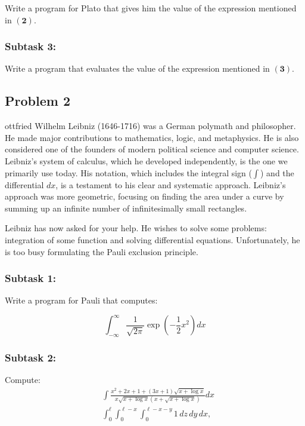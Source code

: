 \documentclass[12pt]{article}
\begin{document}
    Write a program for Plato that gives him the value of the expression mentioned in $\mathbf{(2)}$.
    
    \subsubsection*{\textbf{Subtask 3:}} 
    
    Write a program that evaluates the value of the expression mentioned in $\mathbf{(3)}$.

\newpage
\subsection{Problem 2}
ottfried Wilhelm Leibniz (1646-1716) was a German polymath and philosopher. He made major contributions to mathematics, logic, and metaphysics. He is also considered one of the founders of modern political science and computer science. Leibniz's system of calculus, which he developed independently, is the one we primarily use today. His notation, which includes the integral sign ($\int$) and the differential $dx$, is a testament to his clear and systematic approach. Leibniz's approach was more geometric, focusing on finding the area under a curve by summing up an infinite number of infinitesimally small rectangles.
            
Leibniz has now asked for your help. He wishes to solve some problems: integration of some function and solving differential equations. Unfortunately, he is too busy formulating the Pauli exclusion principle.

    \subsubsection*{\textbf{Subtask 1:}} 
    
    Write a program for Pauli that computes:
    
$$
\int_{-\infty}^{\infty} \frac{1}{\sqrt{2\pi}} \exp \left(-\frac{1}{2}x^2\right) dx
$$

    \subsubsection*{\textbf{Subtask 2:}} 

    Compute: 
    \begin{align}
       &\int \frac{x^2+2x+1+(3x+1)\sqrt{x+\log x}}{x\sqrt{x+\log x}(x+\sqrt{x+\log x})}dx \\
        &\int_{0}^{\ell} \int_{0}^{\ell-x} \int_{0}^{\ell-x-y} 1 \,dz\,dy\,dx, 
    \end{align}
    
\end{document}
